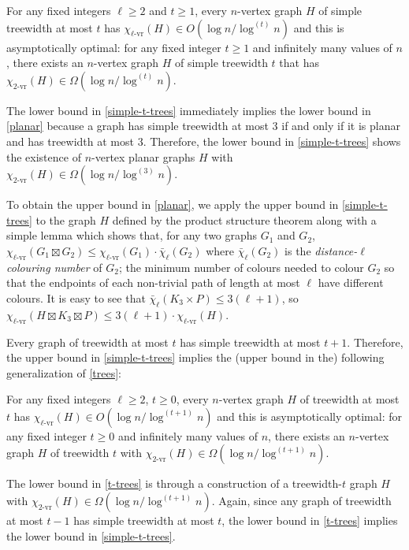 \documentclass[kpfonts]{patmorin}
\newcommand{\rn}[1]{\chi_{\operatorname{#1-vr}}}
\newcommand{\trn}{\rn{2}}
\newcommand{\lrn}{\rn{\ell}}
\newcommand{\dlcn}{\bar{\chi}_\ell}
\theoremstyle{named}
\begin{document}
\begin{thm}\label{simple-t-trees}
    For any fixed integers $\ell\ge 2$ and $t\ge 1$, every $n$-vertex graph $H$ of simple treewidth at most $t$ has $\lrn(H) \in O(\log n/\log^{(t)}n)$ and this is asymptotically optimal: for any fixed integer $t\ge 1$ and infinitely many values of $n$, there exists an $n$-vertex graph $H$ of simple treewidth $t$ that has $\trn(H)\in\Omega(\log n/\log^{(t)} n)$.
\end{thm}

The lower bound in \cref{simple-t-trees} immediately implies the lower bound in \cref{planar} because a graph has simple treewidth at most 3 if and only if it is planar and has treewidth at most 3. Therefore, the lower bound in \cref{simple-t-trees} shows the existence of $n$-vertex planar graphs $H$ with $\trn(H)\in\Omega(\log n/\log^{(3)} n)$.

To obtain the upper bound in \cref{planar}, we apply the upper bound in \cref{simple-t-trees} to the graph $H$ defined by the product structure theorem along with a simple lemma which shows that, for any two graphs $G_1$ and $G_2$, $\lrn(G_1\boxtimes G_2)\le \lrn(G_1)\cdot\dlcn(G_2)$ where $\dlcn(G_2)$ is the \emph{distance-$\ell$ colouring number} of $G_2$;  the minimum number of colours needed to colour $G_2$ so that the endpoints of each non-trivial path of length at most $\ell$ have different colours.  It is easy to see that $\dlcn(K_3\times P)\le 3(\ell+1)$, so $\lrn(H\boxtimes K_3\boxtimes P)\le 3(\ell+1)\cdot\lrn(H)$.

Every graph of treewidth at most $t$ has simple treewidth at most $t+1$. Therefore, the upper bound in \cref{simple-t-trees} implies the (upper bound in the) following generalization of \cref{trees}:

\begin{thm}\label{t-trees}
    For any fixed integers $\ell\ge 2$, $t\ge 0$, every $n$-vertex graph $H$ of treewidth at most $t$ has $\lrn(H) \in O(\log n/\log^{(t+1)} n)$ and this is asymptotically optimal: for any fixed integer $t\ge 0$ and infinitely many values of $n$, there exists an $n$-vertex graph $H$ of treewidth $t$ with $\trn(H)\in\Omega(\log n/\log^{(t+1)} n)$.
\end{thm}

The lower bound in \cref{t-trees} is through a construction of a treewidth-$t$ graph $H$ with $\trn(H)\in\Omega(\log n/\log^{(t+1)} n)$.  Again, since any graph of treewidth at most $t-1$ has simple treewidth at most $t$, the lower bound in \cref{t-trees} implies the lower bound in \cref{simple-t-trees}.
\end{document}
